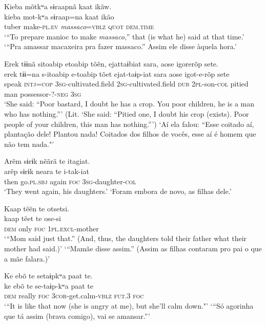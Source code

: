 \documentclass[output=paper,
modfonts,nonflat
]{langsci/langscibook}
\begin{document}
\ea Kieba mõtkʷa sɨraapnã kaat ikãw.\\[.3em]
\gll kieba mot-kʷa sɨraap=na kaat ikão\\
     tuber make-\textsc{pl.ev} \textit{massaco}=\textsc{vblz} \textsc{quot} \textsc{dem.time}\\
\glt ‘“To prepare manioc to make \textit{massaco},” that (is what he) said at that time.’
\glt ‘“Pra amassar macaxeira pra fazer massaco.” Assim ele disse àquela hora.'
\z 

\ea Erek tɨɨnã sitoabip etoabip tõẽn, ejattaɨbiat sara, aose igorerõp sete.\\[.3em]
\gll erek tɨɨ=na s-itoabip e-toabip tõet ejat-taɨp-iat sara aose igot-e-rõp sete\\
     speak \textsc{intj}=\textsc{cop} \textsc{3sg}-cultivated.field \textsc{2sg}-cultivated.field \textsc{dub} \textsc{2pl}-son-\textsc{col} pitied man possessor-?-\textsc{neg} \textsc{3sg}\\
\glt ‘She said: “Poor bastard, I doubt he has a crop. You poor children, he is a man who has nothing.”’  (Lit. ‘She said: “Pitied one, I doubt his crop (exists). Poor people of your children, this man has nothing.”’)
\glt ‘Aí ela falou: “Esse  coitado aí, plantação dele! Plantou nada! Coitados dos filhos de vocês, esse aí é homem que não tem nada."'
\z  
 

\ea Arẽm sɨrɨk nẽãrã te itagiat.\\[.3em]
\gll arẽp sɨrɨk neara te i-tak-iat\\
     then go.\textsc{pl.sbj} again \textsc{foc} \textsc{3sg}-daughter-\textsc{col}\\
\glt ‘They went again, his daughters.’
\glt ‘Foram embora de novo, as filhas dele.'
\z 

\newpage 
\ea Kaap tẽẽn te otsetsi.\\[.3em]
\gll kaap tẽet te ose-si\\
     \textsc{dem} only \textsc{foc} \textsc{1pl.excl}-mother\\
\glt ‘“Mom said just that.” (And, thus, the daughters told their father what their mother had said.)'
\glt ‘“Mamãe disse assim.” (Assim as filhas contaram pro pai o que a mãe falara.)'
\z 

  
\ea Ke ebõ te setaɨpkʷa paat te.\\[.3em]
\gll ke ebõ te se-taɨp-kʷa paat te\\
     \textsc{dem} really \textsc{foc} \textsc{3cor}-get.calm-\textsc{vblz} \textsc{fut}.3 \textsc{foc}\\
\glt ‘“It is like that now (she is angry at me), but she'll calm down."'
\glt ‘“Só agorinha que tá assim (brava comigo), vai se amansar.”'
\z
\end{document}
